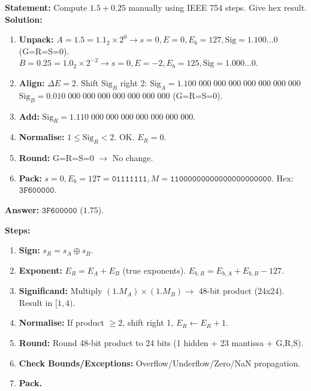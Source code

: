 \documentclass[11pt]{article}
\begin{document}
\begin{exoresolu}
\textbf{Statement:} Compute $1.5 + 0.25$ manually using IEEE 754 steps. Give hex result.
\tcblower
\textbf{Solution:}
\begin{enumerate}
    \item \textbf{Unpack:}
        $A=1.5 = 1.1_2 \times 2^0 \to s=0, E=0, E_b=127, \text{Sig}=1.100\dots0$ (G=R=S=0).
        $B=0.25 = 1.0_2 \times 2^{-2} \to s=0, E=-2, E_b=125, \text{Sig}=1.000\dots0$.
    \item \textbf{Align:} $\Delta E = 2$. Shift $\text{Sig}_B$ right 2:
        $\text{Sig}_A = 1.100\;000\;000\;000\;000\;000\;000\;000$
        $\text{Sig}_B = 0.010\;000\;000\;000\;000\;000\;000\;000$ (G=R=S=0).
    \item \textbf{Add:} $\text{Sig}_R = 1.110\;000\;000\;000\;000\;000\;000\;000$.
    \item \textbf{Normalise:} $1 \le \text{Sig}_R < 2$. OK. $E_R = 0$.
    \item \textbf{Round:} G=R=S=0 $\to$ No change.
    \item \textbf{Pack:} $s=0, E_b=127=\mathtt{01111111}, M=\mathtt{11000000000000000000000}$.
        Hex: $\mathtt{3F600000}$.
\end{enumerate}
\textbf{Answer:} $\mathtt{3F600000}$ ($1.75$).
\end{exoresolu}

\begin{methode}
\textbf{Steps:}
\begin{enumerate}
    \item \textbf{Sign:} $s_R = s_A \oplus s_B$.
    \item \textbf{Exponent:} $E_R = E_A + E_B$ (true exponents). $E_{b,R} = E_{b,A} + E_{b,B} - 127$.
    \item \textbf{Significand:} Multiply $(1.M_A) \times (1.M_B) \to$ 48-bit product (24x24). Result in $[1, 4)$.
    \item \textbf{Normalise:} If product $\ge 2$, shift right 1, $E_R \leftarrow E_R + 1$.
    \item \textbf{Round:} Round 48-bit product to 24 bits (1 hidden + 23 mantissa + G,R,S).
    \item \textbf{Check Bounds/Exceptions:} Overflow/Underflow/Zero/NaN propagation.
    \item \textbf{Pack.}
\end{enumerate}
\end{methode}
\end{document}
